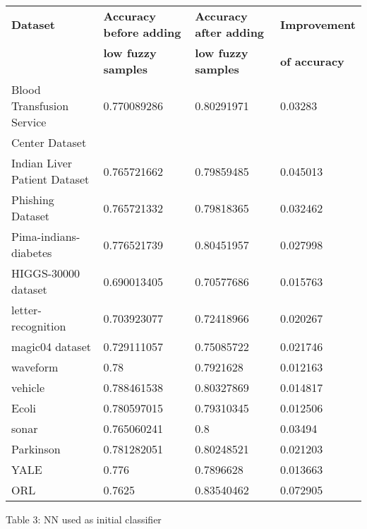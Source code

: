 \documentclass{article}
\begin{document}
		  
		  \begin{center}
		  \textcolor{blue}{
		  		\begin{tabular}{l|l|l|l}
		  			\hline
		  			\textbf{Dataset} & \textbf{Accuracy before adding} & \textbf{Accuracy after adding} & \textbf{Improvement}\\
		  			& \textbf{low fuzzy samples} & \textbf{low fuzzy samples} & \textbf{of accuracy}\\
		  			\hline
		  			\hline
		  			Blood Transfusion Service & 0.770089286 & 0.80291971 & 0.03283 \\
		  			Center Dataset &  &  &  \\
		  			\hline
		  			Indian Liver Patient Dataset & 0.765721662 & 0.79859485 & 0.045013\\
		  			\hline
		  			Phishing Dataset & 0.765721332 & 0.79818365 & 0.032462\\
		  			\hline
		  			Pima-indians-diabetes & 0.776521739 & 0.80451957 & 0.027998\\
		  			\hline
		  			HIGGS-30000 dataset & 0.690013405 & 0.70577686 & 0.015763\\
		  			\hline
		  			letter-recognition & 0.703923077 & 0.72418966 & 0.020267\\
		  			\hline
		  			magic04 dataset & 0.729111057 & 0.75085722 & 0.021746\\
		  			\hline
		  			waveform & 0.78 & 0.7921628 & 0.012163\\
		  			\hline
		  			vehicle & 0.788461538 & 0.80327869 & 0.014817\\
		  			\hline
		  			Ecoli & 0.780597015 & 0.79310345 & 0.012506\\
		  			\hline
		  			sonar & 0.765060241 & 0.8 & 0.03494\\
		  			\hline
		  			Parkinson & 0.781282051  & 0.80248521 & 0.021203\\
		  			\hline
		  			YALE & 0.776 & 0.7896628 & 0.013663\\
		  			\hline
		  			ORL & 0.7625 & 0.83540462 & 0.072905\\
		  			\hline
		  		\end{tabular}
		  	}
		  	\end{center}


		
		\newpage
		
		 \begin{center}
			\small Table 3: NN used as initial classifier\\\vspace{0.5em}
		\end{center}
		
\end{document}

